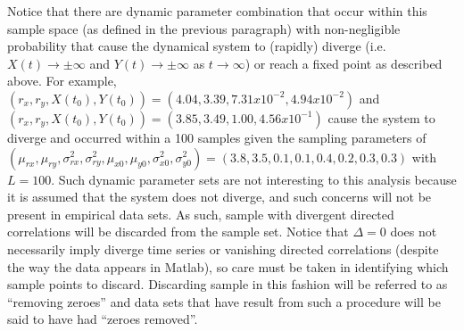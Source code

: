 \documentclass[a4paper,11pt]{article}
\begin{document}
Notice that there are dynamic parameter combination that occur within this sample space (as defined in the previous paragraph) with non-negligible probability that cause the dynamical system to (rapidly) diverge (i.e.\ $X(t)\rightarrow \pm \infty$ and $Y(t)\rightarrow \pm \infty$ as $t\rightarrow\infty$) or reach a fixed point as described above.  For example, $\left(r_x,r_y,X(t_0),Y(t_0)\right) = \left(4.04,3.39,7.31x10^{-2},4.94x10^{-2}\right)$ and $\left(r_x,r_y,X(t_0),Y(t_0)\right) = \left(3.85,3.49,1.00,4.56x10^{-1}\right)$ cause the system to diverge and occurred within a 100 samples given the sampling parameters of $\left(\mu_{rx},\mu_{ry},\sigma^2_{rx},\sigma^2_{ry},\mu_{x0},\mu_{y0},\sigma^2_{x0},\sigma^2_{y0}\right) = \left(3.8,3.5,0.1,0.1,0.4,0.2,0.3,0.3\right)$ with $L=100$.  Such dynamic parameter sets are not interesting to this analysis because it is assumed that the system does not diverge, and such concerns will not be present in empirical data sets.  As such, sample with divergent directed correlations will be discarded from the sample set.  Notice that $\Delta=0$ does not necessarily imply diverge time series or vanishing directed correlations (despite the way the data appears in Matlab), so care must be taken in identifying which sample points to discard.  Discarding sample in this fashion will be referred to as ``removing zeroes'' and data sets that have result from such a procedure will be said to have had ``zeroes removed''.
\end{document}
